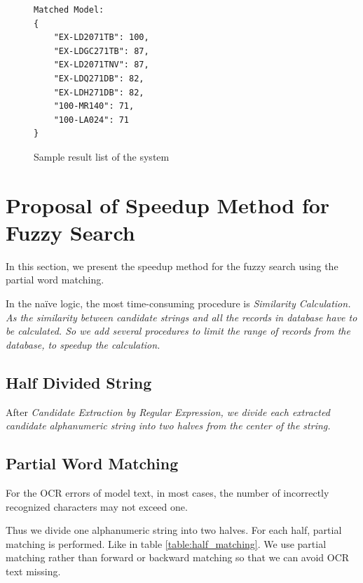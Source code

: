 \documentclass[technicalreport]{ieicej}
\begin{document}
        \begin{figure}[t] 
            \begin{center}
                \begin{BVerbatim}
Matched Model:
{
    "EX-LD2071TB": 100,
    "EX-LDGC271TB": 87,
    "EX-LD2071TNV": 87,
    "EX-LDQ271DB": 82,
    "EX-LDH271DB": 82,
    "100-MR140": 71,
    "100-LA024": 71
}
                \end{BVerbatim}
            \end{center}
            \caption{Sample result list of the system}
            \label{fig:result-sample}
        \end{figure}


\section{Proposal of Speedup Method for Fuzzy Search}
\label{sec:speedup}
    In this section, we present the speedup method for the fuzzy search using the partial word matching.

    In the naïve logic, the most time-consuming procedure is \em{Similarity Calculation}. As the similarity between candidate strings and all the records in database have to be calculated. So we add several procedures to limit the range of records from the database, to speedup the calculation.

        \subsection{Half Divided String}
            After \em{Candidate Extraction by Regular Expression}, we divide each extracted candidate alphanumeric string into two halves from the center of the string.

        \subsection{Partial Word Matching}

            For the OCR errors of model text, in most cases, the number of incorrectly recognized characters may not exceed one.

            Thus we divide one alphanumeric string into two halves. For each half, partial matching is performed. Like in table \ref{table:half_matching}. We use partial matching rather than forward or backward matching so that we can avoid OCR text missing.
\end{document}
